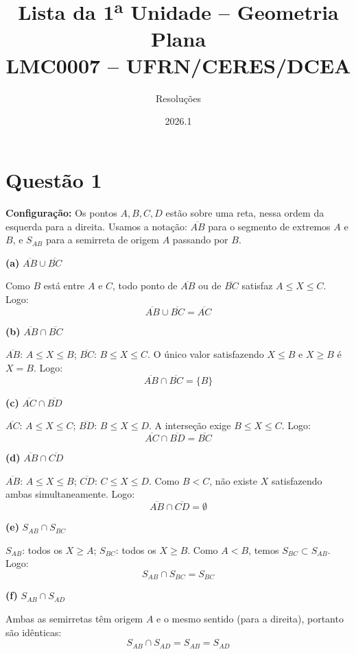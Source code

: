 \documentclass[12pt,a4paper]{article}
\title{\textbf{Lista da 1\textsuperscript{a} Unidade -- Geometria Plana}\\
\large LMC0007 -- UFRN/CERES/DCEA}
\author{Resolu\c{c}\~oes}
\date{2026.1}
\begin{document}
\maketitle
\tableofcontents
\newpage

\section*{Quest\~ao 1}

\textbf{Configura\c{c}\~ao:} Os pontos $A, B, C, D$ est\~ao sobre uma reta, nessa ordem da esquerda para a direita. Usamos a nota\c{c}\~ao: $\overline{AB}$ para o segmento de extremos $A$ e $B$, e $S_{AB}$ para a semirreta de origem $A$ passando por $B$.

\bigskip
\textbf{(a)} $\overline{AB} \cup \overline{BC}$

Como $B$ est\'a entre $A$ e $C$, todo ponto de $\overline{AB}$ ou de $\overline{BC}$ satisfaz $A \leq X \leq C$. Logo:
$$\overline{AB} \cup \overline{BC} = \overline{AC}$$

\textbf{(b)} $\overline{AB} \cap \overline{BC}$

$\overline{AB}$: $A \leq X \leq B$; $\overline{BC}$: $B \leq X \leq C$. O \'unico valor satisfazendo $X \leq B$ e $X \geq B$ \'e $X = B$. Logo:
$$\overline{AB} \cap \overline{BC} = \{B\}$$

\textbf{(c)} $\overline{AC} \cap \overline{BD}$

$\overline{AC}$: $A \leq X \leq C$; $\overline{BD}$: $B \leq X \leq D$. A interse\c{c}\~ao exige $B \leq X \leq C$. Logo:
$$\overline{AC} \cap \overline{BD} = \overline{BC}$$

\textbf{(d)} $\overline{AB} \cap \overline{CD}$

$\overline{AB}$: $A \leq X \leq B$; $\overline{CD}$: $C \leq X \leq D$. Como $B < C$, n\~ao existe $X$ satisfazendo ambas simultaneamente. Logo:
$$\overline{AB} \cap \overline{CD} = \emptyset$$

\textbf{(e)} $S_{AB} \cap S_{BC}$

$S_{AB}$: todos os $X \geq A$; $S_{BC}$: todos os $X \geq B$. Como $A < B$, temos $S_{BC} \subset S_{AB}$. Logo:
$$S_{AB} \cap S_{BC} = S_{BC}$$

\textbf{(f)} $S_{AB} \cap S_{AD}$

Ambas as semirretas t\^em origem $A$ e o mesmo sentido (para a direita), portanto s\~ao id\^enticas:
$$S_{AB} \cap S_{AD} = S_{AB} = S_{AD}$$
\end{document}
